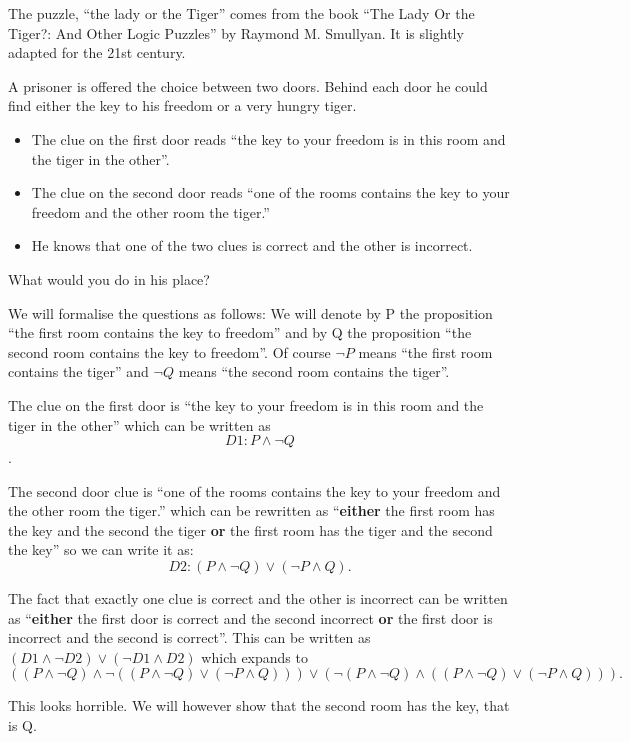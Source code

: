 The puzzle, ``the lady or the Tiger'' comes from the book  ``The Lady Or the Tiger?: And Other Logic Puzzles'' by Raymond M. Smullyan. It is slightly adapted for the 21st century.

A  prisoner is offered the choice between two doors. Behind each door he could find either the key to his freedom or a very hungry tiger.

 \begin{itemize}

 \item The clue on the first door reads ``the key to your freedom  is in this room and the tiger in the other''.
 \item The clue on the second door reads ``one of the rooms contains  the key to your freedom and the other room the tiger.''
  \item He knows that one of the two clues is correct and the other is incorrect.
 \end{itemize}

What would you do in his place?

We will formalise the questions as follows: We will denote by P the proposition  ``the first room contains the key to freedom'' and by Q the proposition ``the second room contains the key to freedom''. Of course $\neg P$ means ``the first room contains the tiger'' and  $\neg Q$ means ``the second room contains the tiger''.

The clue on the first door is ``the key to your freedom  is in this room and the tiger in the other'' which can be written as $$D1:P\land \neg Q$$.

The second door clue is ``one of the rooms contains  the key to your freedom and the other room the tiger.'' which can be rewritten as ``{\bf either} the first room has the key and the second the tiger {\bf or} the first room has the tiger and the second the key'' so we can write it as:
 $$D2 : (P\land \neg Q) \lor (\neg P \land Q).$$ 
 
 The fact that exactly one clue is correct and the other is incorrect can be written as ``{\bf either} the first door is correct and the second incorrect {\bf or} the first door is incorrect and the second is correct''. This can be written as $(D1 \land \neg D2 )\lor (\neg D1 \land D2)$ which expands to $$((P\land \neg Q)\land \neg ((P\land \neg Q) \lor (\neg P \land Q)))\lor (\neg(P\land \neg Q) \land ((P\land \neg Q) \lor (\neg P \land Q))).$$ 

This looks horrible. We will however show that the second room has the key, that is Q.



